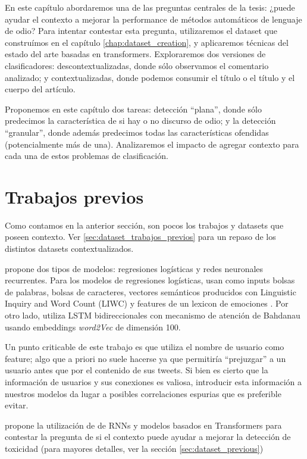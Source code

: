 
En este capítulo abordaremos una de las preguntas centrales de la tesis: ¿puede ayudar el contexto a mejorar la performance de métodos automáticos de lenguaje de odio? Para intentar contestar esta pregunta, utilizaremos el dataset que construímos en el capítulo \ref{chap:dataset_creation}, y aplicaremos técnicas del estado del arte basadas en transformers. Exploraremos dos versiones de clasificadores: descontextualizadas, donde sólo observamos el comentario analizado; y contextualizadas, donde podemos consumir el título o el título y el cuerpo del artículo.

Proponemos en este capítulo dos tareas: detección ``plana'', donde sólo predecimos la característica de si hay o no discurso de odio; y la detección ``granular'', donde además predecimos todas las características ofendidas (potencialmente más de una). Analizaremos el impacto de agregar contexto para cada una de estos problemas de clasificación.


\section{Trabajos previos}

Como contamos en la anterior sección, son pocos los trabajos y datasets que poseen contexto. Ver \ref{sec:dataset_trabajos_previos} para un repaso de los distintos datasets contextualizados.

\citet{gao-huang-2017-detecting} propone dos tipos de modelos: regresiones logísticas y redes neuronales recurrentes. Para los modelos de regresiones logísticas, usan como inputs bolsas de palabras, bolsas de caracteres, vectores semánticos producidos con Linguistic Inquiry and Word Count (LIWC) \cite{pennebaker2001linguistic} y features de un lexicon de emociones \cite{mohammad2013nrc}. Por otro lado, utiliza LSTM bidireccionales con mecanismo de atención de Bahdanau \cite{bahdanau2014neural} usando embeddings \emph{word2Vec} de dimensión 100.

Un punto criticable de este trabajo es que utiliza el nombre de usuario como feature; algo que a priori no suele hacerse ya que permitiría ``prejuzgar'' a un usuario antes que por el contenido de sus tweets. Si bien es cierto que la información de usuarios y sus conexiones es valiosa, introducir esta información a nuestros modelos da lugar a posibles correlaciones espurias que es preferible evitar.

\citet{pavlopoulos2020toxicity} propone la utilización de de RNNs y modelos basados en Transformers para contestar la pregunta de si el contexto puede ayudar a mejorar la detección de toxicidad (para mayores detalles, ver la sección \ref{sec:dataset_previous})

